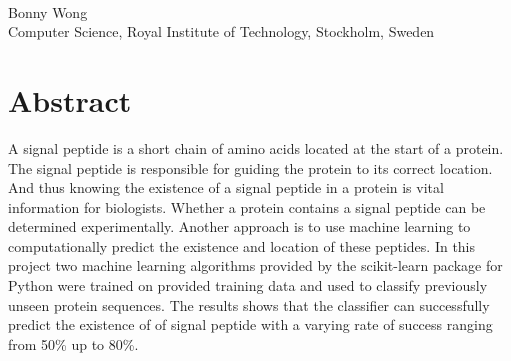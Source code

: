 \documentclass[10pt,letterpaper]{article}
\date{}
\begin{document}
\vspace*{0.35in}

\begin{flushleft}
{\Large
\textbf{}
}
\newline
\\
Bonny Wong
\\
\bigskip
Computer Science, Royal Institute of Technology, Stockholm, Sweden
\\
\bigskip

% 
%






\end{flushleft}
\section*{Abstract}
A signal peptide is a short chain of amino acids located at the start of a protein. The signal peptide is responsible for guiding the protein to its correct location. And thus knowing the existence of a signal peptide in a protein is vital information for biologists. Whether a protein contains a signal peptide can be determined experimentally. Another approach is to use machine learning to computationally predict the existence and location of these peptides. In this project two machine learning algorithms provided by the scikit-learn package for Python were trained on provided training data and used to classify previously unseen protein sequences. The results shows that the classifier can successfully predict the existence of of signal peptide with a varying rate of success ranging from 50\% up to 80\%. 
\end{document}
